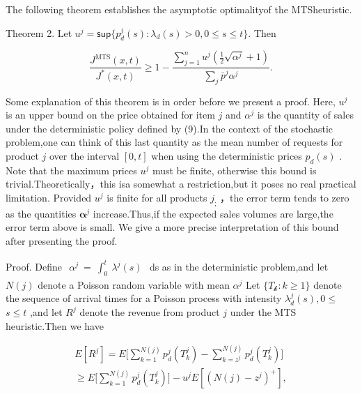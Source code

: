 The following theorem establishes the asymptotic optimalityof the
MTSheuristic.

Theorem 2. Let
\(u ^ { j } = \mathsf { s u p } \{ p _ { d } ^ { j } ( s ) \colon \lambda _ { d } ( s ) > 0 , 0 \leqslant s \leqslant t \} .\)
Then

\[
\frac { J ^ { \mathrm { M T S } } ( x , t ) } { J ^ { * } ( x , t ) } \geqslant 1 - \frac { \sum _ { j = 1 } ^ { n } u ^ { j } ( \frac { 1 } { 2 } \sqrt { \alpha ^ { j } } + 1 ) } { \sum _ { j } \bar { p } ^ { j } \alpha ^ { j } } .
\]

Some explanation of this theorem is in order before we present a proof.
Here, \(u ^ { j }\) is an upper bound on the price obtained for item
\(j\) and \(\alpha ^ { j }\) is the quantity of sales under the
deterministic policy defined by (9).In the context of the stochastic
problem,one can think of this last quantity as the mean number of
requests for product \(j\) over the interval \([ 0 , t ]\) when using
the deterministic prices \(p _ { d } ( s )\) . Note that the maximum
prices \(u ^ { j }\) must be finite, otherwise this bound is
trivial.Theoretically，this isa somewhat a restriction,but it poses no
real practical limitation. Provided \(u ^ { j }\) is finite for all
products \(j _ { ; }\) ，the error term tends to zero as the quantities
\(\boldsymbol { \alpha } ^ { j }\) increase.Thus,if the expected sales
volumes are large,the error term above is small. We give a more precise
interpretation of this bound after presenting the proof.

Proof. Define
\(\begin{array} { r } { \alpha ^ { j } ~ = ~ \int _ { 0 } ^ { t } ~ \lambda ^ { j } ( s ) } \end{array}\)
ds as in the deterministic problem,and let \(N ( j )\) denote a Poisson
random variable with mean \(\alpha ^ { j }\) Let
\(\{ T _ { \mathcal { k } } \colon k \geqslant 1 \}\) denote the
sequence of arrival times for a Poisson process with intensity
\(\lambda _ { d } ^ { j } ( s ) , 0 \leqslant\) \(s \leqslant t\) ,and
let \(R ^ { j }\) denote the revenue from product \(j\) under the MTS
heuristic.Then we have

\[
\begin{array} { l } { { \displaystyle E [ R ^ { j } ] = E \biggl [ \sum _ { k = 1 } ^ { N ( j ) } p _ { d } ^ { j } ( T _ { k } ^ { j } ) - \sum _ { k = z ^ { j } } ^ { N ( j ) } p _ { d } ^ { j } ( T _ { k } ^ { j } ) \biggr ] } } \\ { { \displaystyle \geqslant E \biggl [ \sum _ { k = 1 } ^ { N ( j ) } p _ { d } ^ { j } ( T _ { k } ^ { j } ) \biggr ] - u ^ { j } E [ ( N ( j ) - z ^ { j } ) ^ { + } ] , } } \end{array}
\]

